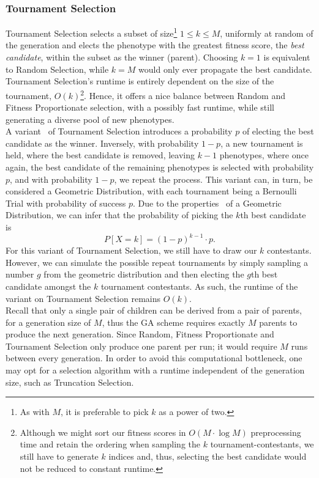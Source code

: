 \subsubsection{Tournament Selection}
Tournament Selection selects a subset of size\footnote{As with $M$, it is preferable to pick $k$ as a power of two.} $1 \leq k \leq M$, uniformly at random of the generation and elects the phenotype with the greatest fitness score, the \textit{best candidate}, within the subset as the winner (parent). Choosing $k = 1 $ is equivalent to Random Selection, while $k = M$ would only ever propagate the best candidate.
\\
Tournament Selection's runtime is entirely dependent on the size of the tournament, $O(k)$\footnote{Although we might sort our fitness scores in $O(M \cdot \log M)$ preprocessing time and retain the ordering when sampling the $k$ tournament-contestants, we still have to generate $k$ indices and, thus, selecting the best candidate would not be reduced to constant runtime.}. Hence, it offers a nice balance between Random and Fitness Proportionate selection, with a possibly fast runtime, while still generating a diverse pool of new phenotypes.
\\
A variant~\cite{Wiki-tournament-selection} of Tournament Selection introduces a probability $p$ of electing the best candidate as the winner. Inversely, with probability $1-p$, a new tournament is held, where the best candidate is removed, leaving $k-1$ phenotypes, where once again, the best candidate of the remaining phenotypes is selected with probability $p$, and with probability $1-p$, we repeat the process. This variant can, in turn, be considered a Geometric Distribution, with each tournament being a Bernoulli Trial with probability of success $p$. Due to the properties~\cite{Wiki-geometric-distribution} of a Geometric Distribution, we can infer that the probability of picking the $k$th best candidate is
\begin{equation*}
    P\left[ X = k \right] = (1-p)^{k-1} \cdot p.
\end{equation*}
For this variant of Tournament Selection, we still have to draw our $k$ contestants. However, we can simulate the possible repeat tournaments by simply sampling a number $g$ from the geometric distribution and then electing the $g$th best candidate amongst the $k$ tournament contestants. As such, the runtime of the variant on Tournament Selection remains $O(k)$.
\\
Recall that only a single pair of children can be derived from a pair of parents, for a generation size of $M$, thus the GA scheme requires exactly $M$ parents to produce the next generation. Since Random, Fitness Proportionate and Tournament Selection only produce one parent per run; it would require $M$ runs between every generation. In order to avoid this computational bottleneck, one may opt for a selection algorithm with a runtime independent of the generation size, such as Truncation Selection.

